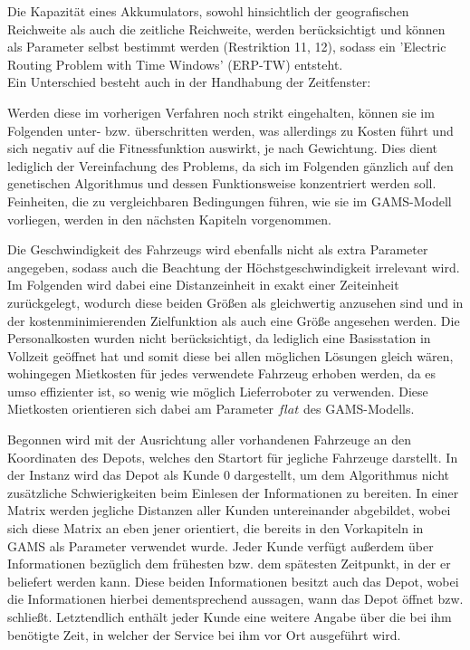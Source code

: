 \documentclass[a4paper,12pt,parskip,bibtotoc,liststotoc]{article}
\begin{document}
Die Kapazität eines Akkumulators, sowohl hinsichtlich der geografischen Reichweite als auch die zeitliche Reichweite, werden berücksichtigt und können als Parameter selbst bestimmt werden (Restriktion 11, 12), sodass ein 'Electric Routing Problem with Time Windows' (ERP-TW) entsteht.\\

Ein Unterschied besteht auch in der Handhabung der Zeitfenster:

Werden diese im vorherigen Verfahren noch strikt eingehalten, können sie im Folgenden unter- bzw. überschritten werden, was allerdings zu Kosten führt und sich negativ auf die Fitnessfunktion auswirkt, je nach Gewichtung.
Dies dient lediglich der Vereinfachung des Problems, da sich im Folgenden gänzlich auf den genetischen Algorithmus und dessen Funktionsweise konzentriert werden soll. 
Feinheiten, die zu vergleichbaren Bedingungen führen, wie sie im GAMS-Modell vorliegen, werden in den nächsten Kapiteln vorgenommen. 

Die Geschwindigkeit des Fahrzeugs wird ebenfalls nicht als extra Parameter angegeben, sodass auch die Beachtung der Höchstgeschwindigkeit irrelevant wird.
Im Folgenden wird dabei eine Distanzeinheit in exakt einer Zeiteinheit zurückgelegt, wodurch diese beiden Größen als gleichwertig anzusehen sind und in der kostenminimierenden Zielfunktion als auch eine Größe angesehen werden.
Die Personalkosten wurden nicht berücksichtigt, da lediglich eine Basisstation in Vollzeit geöffnet hat und somit diese bei allen möglichen Lösungen gleich wären, wohingegen Mietkosten für jedes verwendete Fahrzeug erhoben werden, da es umso effizienter ist, so wenig wie möglich Lieferroboter zu verwenden.
Diese Mietkosten orientieren sich dabei am Parameter $flat$ des GAMS-Modells.

Begonnen wird mit der Ausrichtung aller vorhandenen Fahrzeuge an den Koordinaten des Depots, welches den Startort für jegliche Fahrzeuge darstellt.
In der Instanz wird das Depot als Kunde 0 dargestellt, um dem Algorithmus nicht zusätzliche Schwierigkeiten beim Einlesen der Informationen zu bereiten.
In einer Matrix werden jegliche Distanzen aller Kunden untereinander abgebildet, wobei sich diese Matrix an eben jener orientiert, die bereits in den Vorkapiteln in GAMS als Parameter verwendet wurde.
Jeder Kunde verfügt außerdem über Informationen bezüglich dem frühesten bzw. dem spätesten Zeitpunkt, in der er beliefert werden kann.
Diese beiden Informationen besitzt auch das Depot, wobei die Informationen hierbei dementsprechend aussagen, wann das Depot öffnet bzw. schließt.
Letztendlich enthält jeder Kunde eine weitere Angabe über die bei ihm benötigte Zeit, in welcher der Service bei ihm vor Ort ausgeführt wird.
\end{document}
